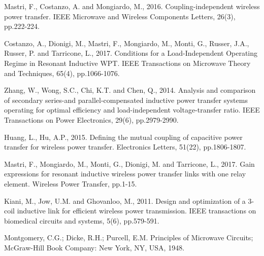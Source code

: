 \documentclass[journal]{IEEEtran}
\begin{document}
\begin{thebibliography}{1}

Mastri, F., Costanzo, A. and Mongiardo, M., 2016. Coupling-independent wireless power transfer. IEEE Microwave and Wireless Components Letters, 26(3), pp.222-224.

Costanzo, A., Dionigi, M., Mastri, F., Mongiardo, M., Monti, G., Russer, J.A., Russer, P. and Tarricone, L., 2017. Conditions for a Load-Independent Operating Regime in Resonant Inductive WPT. IEEE Transactions on Microwave Theory and Techniques, 65(4), pp.1066-1076.

Zhang, W., Wong, S.C., Chi, K.T. and Chen, Q., 2014. Analysis and comparison of secondary series-and parallel-compensated inductive power transfer systems operating for optimal efficiency and load-independent voltage-transfer ratio. IEEE Transactions on Power Electronics, 29(6), pp.2979-2990.

Huang, L., Hu, A.P., 2015. Defining the mutual coupling of capacitive power transfer for wireless power transfer. Electronics Letters, 51(22), pp.1806-1807.

Mastri, F., Mongiardo, M., Monti, G., Dionigi, M. and Tarricone, L., 2017. Gain expressions for resonant inductive wireless power transfer links with one relay element. Wireless Power Transfer, pp.1-15.


Kiani, M., Jow, U.M. and Ghovanloo, M., 2011. Design and optimization of a 3-coil inductive link for efficient wireless power transmission. IEEE transactions on biomedical circuits and systems, 5(6), pp.579-591.	

Montgomery, C.G.; Dicke, R.H.; Purcell, E.M. Principles of Microwave Circuits; McGraw-Hill Book Company: New York, NY, USA, 1948.



\end{thebibliography}
\end{document}
